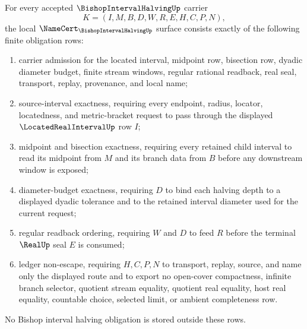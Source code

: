 \begin{theorem}
\label{thm:bishop-interval-halving-namecert-obligations}
For every accepted $\BishopIntervalHalvingUp$ carrier
$$
K=(I,M,B,D,W,R,E,H,C,P,N),
$$
the local $\NameCert_{\BishopIntervalHalvingUp}$ surface consists exactly of the following finite obligation rows:
\begin{enumerate}
\item carrier admission for the located interval, midpoint row, bisection row, dyadic diameter budget, finite stream windows, regular rational readback, real seal, transport, replay, provenance, and local name;
\item source-interval exactness, requiring every endpoint, radius, locator, locatedness, and metric-bracket request to pass through the displayed $\LocatedRealIntervalUp$ row $I$;
\item midpoint and bisection exactness, requiring every retained child interval to read its midpoint from $M$ and its branch data from $B$ before any downstream window is exposed;
\item diameter-budget exactness, requiring $D$ to bind each halving depth to a displayed dyadic tolerance and to the retained interval diameter used for the current request;
\item regular readback ordering, requiring $W$ and $D$ to feed $R$ before the terminal $\RealUp$ seal $E$ is consumed;
\item ledger non-escape, requiring $H,C,P,N$ to transport, replay, source, and name only the displayed route and to export no open-cover compactness, infinite branch selector, quotient stream equality, quotient real equality, host real equality, countable choice, selected limit, or ambient completeness row.
\end{enumerate}
No Bishop interval halving obligation is stored outside these rows.
\end{theorem}
